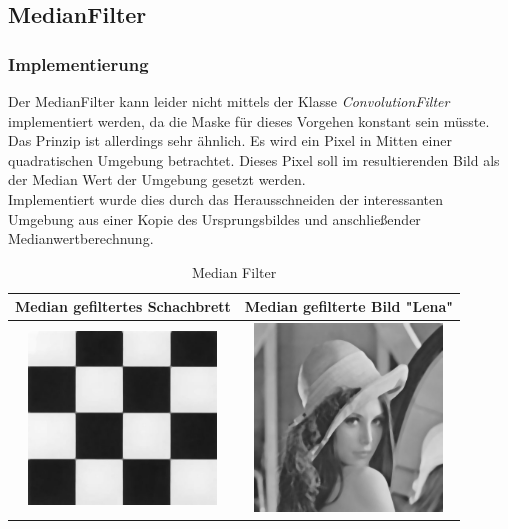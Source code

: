 \documentclass[12pt,german]{article}
\begin{document}
\newpage
\subsection{MedianFilter}
\subsubsection{Implementierung}

Der MedianFilter kann leider nicht mittels der Klasse \textit{ConvolutionFilter} implementiert werden, da die Maske für dieses Vorgehen konstant sein müsste. Das Prinzip ist allerdings sehr ähnlich. Es wird ein Pixel in Mitten einer quadratischen Umgebung betrachtet. Dieses Pixel soll im resultierenden Bild als der Median Wert der Umgebung gesetzt werden. \\
Implementiert wurde dies durch das Herausschneiden der interessanten Umgebung aus einer Kopie des Ursprungsbildes und anschließender Medianwertberechnung. 



\begin{table}[H]
  \centering
  \begin{tabular}{| c | c |}
    \hline
 	 Median gefiltertes Schachbrett & Median gefilterte Bild "Lena" \\
    \hline
	\includegraphics[width=5cm]{../testData/Median/SchachbrettR4.jpg} & 	\includegraphics[width=5cm]{../testData/Median/LenaMedian.jpg} \\
	\hline
  \end{tabular}
  \caption{Median Filter}
  \label{tab:MedianFilter}
\end{table}
\end{document}
